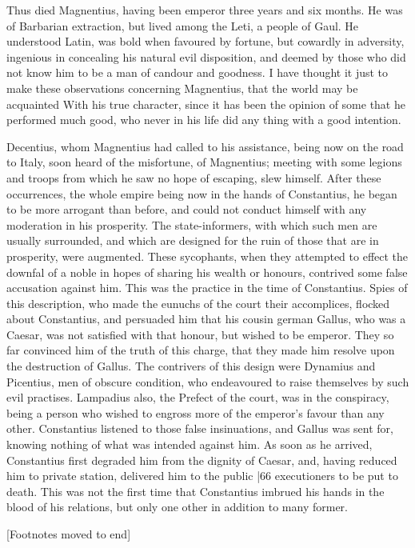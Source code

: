 Thus died Magnentius, having been emperor three years and six months. He was of Barbarian extraction, but lived among the Leti, a people of Gaul. He understood Latin, was bold when favoured by fortune, but cowardly in adversity, ingenious in concealing his natural evil disposition, and deemed by those who did not know him to be a man of candour and goodness. I have thought it just to make these observations concerning Magnentius, that the world may be acquainted With his true character, since it has been the opinion of some that he performed much good, who never in his life did any thing with a good intention.

Decentius, whom Magnentius had called to his assistance, being now on the road to Italy, soon heard of the misfortune, of Magnentius; meeting with some legions and troops from which he saw no hope of escaping, slew himself. After these occurrences, the whole empire being now in the hands of Constantius, he began to be more arrogant than before, and could not conduct himself with any moderation in his prosperity. The state-informers, with which such men are usually surrounded, and which are designed for the ruin of those that are in prosperity, were augmented. These sycophants, when they attempted to effect the downfal of a noble in hopes of sharing his wealth or honours, contrived some false accusation against him. This was the practice in the time of Constantius. Spies of this description, who made the eunuchs of the court their accomplices, flocked about Constantius, and persuaded him that his cousin german Gallus, who was a Caesar, was not satisfied with that honour, but wished to be emperor. They so far convinced him of the truth of this charge, that they made him resolve upon the destruction of Gallus. The contrivers of this design were Dynamius and Picentius, men of obscure condition, who endeavoured to raise themselves by such evil practises. Lampadius also, the Prefect of the court, was in the conspiracy, being a person who wished to engross more of the emperor's favour than any other. Constantius listened to those false insinuations, and Gallus was sent for, knowing nothing of what was intended against him. As soon as he arrived, Constantius first degraded him from the dignity of Caesar, and, having reduced him to private station, delivered him to the public
|66 executioners to be put to death. This was not the first time that Constantius imbrued his hands in the blood of his relations, but only one other in addition to many former.

[Footnotes moved to end]

